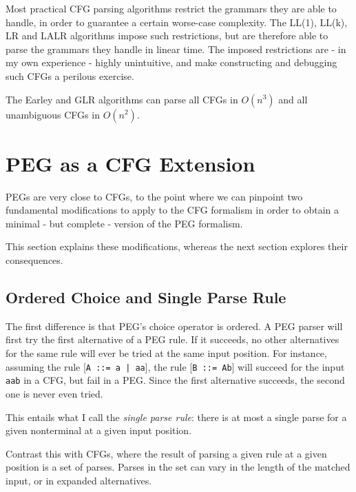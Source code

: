 Most practical CFG parsing algorithms restrict the grammars they are able to
handle, in order to guarantee a certain worse-case complexity. The LL(1), LL(k),
LR and LALR algorithms impose such restrictions, but are therefore able to parse
the grammars they handle in linear time. The imposed restrictions are - in my
own experience - highly unintuitive, and make constructing and debugging such
CFGs a perilous exercise.

The Earley and GLR algorithms can parse all CFGs in $O(n^3)$ and all unambiguous
CFGs in $O(n^2)$.

\section{PEG as a CFG Extension}
\label{cfg_extension}

PEGs are very close to CFGs, to the point where we can pinpoint two fundamental
modifications to apply to the CFG formalism in order to obtain a minimal - but
complete - version of the PEG formalism.

This section explains these modifications, whereas the next section explores
their consequences.

\subsection{Ordered Choice and Single Parse Rule}
\label{single_parse_rule}

The first difference is that PEG's choice operator is ordered. A PEG parser will
first try the first alternative of a PEG rule. If it succeeds, no other
alternatives for the same rule will ever be tried at the same input
position. For instance, assuming the rule [\texttt{A ::= a | aa}], the rule
[\texttt{B ::= Ab}] will succeed for the input \texttt{aab} in a CFG, but fail
in a PEG. Since the first alternative succeeds, the second one is never even
tried.

This entails what I call the \emph{single parse rule}: there is at most a single
parse for a given nonterminal at a given input position.

Contrast this with CFGs, where the result of parsing a given rule at a given
position is a set of parses. Parses in the set can vary in the length of the
matched input, or in expanded alternatives.

